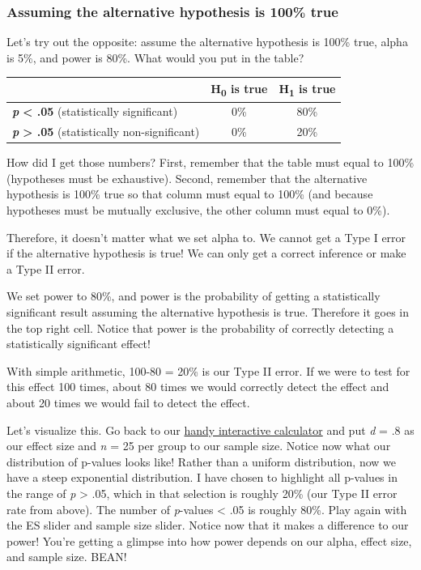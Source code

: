 \documentclass[
]{book}
\begin{document}
\hypertarget{assuming-the-alternative-hypothesis-is-100-true}{%
\subsubsection{Assuming the alternative hypothesis is 100\% true}\label{assuming-the-alternative-hypothesis-is-100-true}}

Let's try out the opposite: assume the alternative hypothesis is 100\% true, alpha is 5\%, and power is 80\%. What would you put in the table?

\begin{longtable}[]{@{}lcc@{}}
\toprule
& H\textsubscript{0} is true & H\textsubscript{1} is true\tabularnewline
\midrule
\endhead
\textbf{\emph{p}} \textbf{\textless{} .05} (statistically significant) & 0\% & 80\%\tabularnewline
\textbf{\emph{p}} \textbf{\textgreater{} .05} (statistically non-significant) & 0\% & 20\%\tabularnewline
\bottomrule
\end{longtable}

How did I get those numbers? First, remember that the table must equal to 100\% (hypotheses must be exhaustive). Second, remember that the alternative hypothesis is 100\% true so that column must equal to 100\% (and because hypotheses must be mutually exclusive, the other column must equal to 0\%).

Therefore, it doesn't matter what we set alpha to. We cannot get a Type I error if the alternative hypothesis is true! We can only get a correct inference or make a Type II error.

We set power to 80\%, and power is the probability of getting a statistically significant result assuming the alternative hypothesis is true. Therefore it goes in the top right cell. Notice that power is the probability of correctly detecting a statistically significant effect!

With simple arithmetic, 100-80 = 20\% is our Type II error. If we were to test for this effect 100 times, about 80 times we would correctly detect the effect and about 20 times we would fail to detect the effect.

Let's visualize this. Go back to our \href{https://rpsychologist.com/d3/pdist/}{handy interactive calculator} and put \emph{d} = .8 as our effect size and \emph{n} = 25 per group to our sample size. Notice now what our distribution of p-values looks like! Rather than a uniform distribution, now we have a steep exponential distribution. I have chosen to highlight all p-values in the range of \emph{p} \textgreater{} .05, which in that selection is roughly 20\% (our Type II error rate from above). The number of \emph{p}-values \textless{} .05 is roughly 80\%. Play again with the ES slider and sample size slider. Notice now that it makes a difference to our power! You're getting a glimpse into how power depends on our alpha, effect size, and sample size. BEAN!
\end{document}
